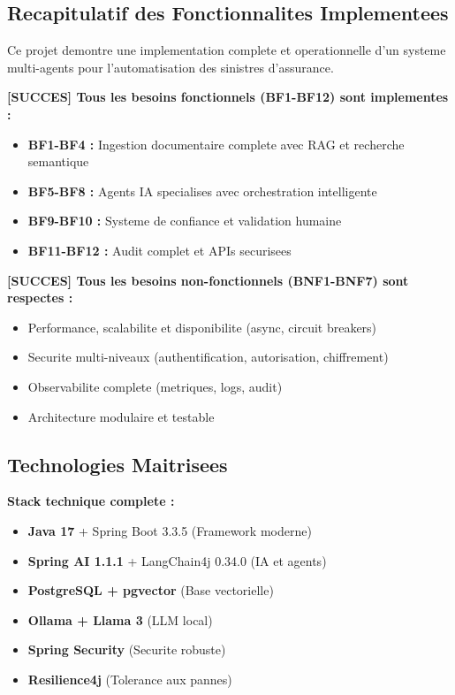 \documentclass[a4paper,12pt]{article}
\begin{document}
\subsection{Recapitulatif des Fonctionnalites Implementees}

Ce projet demontre une implementation complete et operationnelle d'un systeme multi-agents pour l'automatisation des sinistres d'assurance. 

\textbf{[SUCCES] Tous les besoins fonctionnels (BF1-BF12) sont implementes :}
\begin{itemize}
    \item \textbf{BF1-BF4 :} Ingestion documentaire complete avec RAG et recherche semantique
    \item \textbf{BF5-BF8 :} Agents IA specialises avec orchestration intelligente
    \item \textbf{BF9-BF10 :} Systeme de confiance et validation humaine 
    \item \textbf{BF11-BF12 :} Audit complet et APIs securisees
\end{itemize}

\textbf{[SUCCES] Tous les besoins non-fonctionnels (BNF1-BNF7) sont respectes :}
\begin{itemize}
    \item Performance, scalabilite et disponibilite (async, circuit breakers)
    \item Securite multi-niveaux (authentification, autorisation, chiffrement)
    \item Observabilite complete (metriques, logs, audit)
    \item Architecture modulaire et testable
\end{itemize}

\subsection{Technologies Maitrisees}

\textbf{Stack technique complete :}
\begin{itemize}
    \item \textbf{Java 17} + Spring Boot 3.3.5 (Framework moderne)
    \item \textbf{Spring AI 1.1.1} + LangChain4j 0.34.0 (IA et agents)
    \item \textbf{PostgreSQL + pgvector} (Base vectorielle)
    \item \textbf{Ollama + Llama 3} (LLM local)
    \item \textbf{Spring Security} (Securite robuste)
    \item \textbf{Resilience4j} (Tolerance aux pannes)
\end{itemize}
\end{document}
